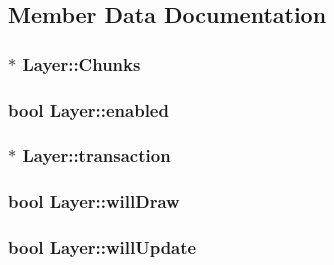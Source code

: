 \subsection{Member Data Documentation}
\hypertarget{class_layer_ab5408f6d27ad51d73df507296f16c811}{
\subsubsection[{Chunks}]{$\ast$ Layer\-::\-Chunks\hspace{0.3cm}{\ttfamily [protected]}}}\label{class_layer_ab5408f6d27ad51d73df507296f16c811}
\hypertarget{class_layer_af9f9c9a8c4a053bd829a06273df297bd}{
\subsubsection[{enabled}]{\setlength{\rightskip}{0pt plus 5cm}bool Layer\-::enabled\hspace{0.3cm}{\ttfamily [protected]}}}\label{class_layer_af9f9c9a8c4a053bd829a06273df297bd}
\hypertarget{class_layer_a3f0f6e109409d047c650380b6715c316}{
\subsubsection[{transaction}]{$\ast$ Layer\-::transaction\hspace{0.3cm}{\ttfamily [protected]}}}\label{class_layer_a3f0f6e109409d047c650380b6715c316}
\hypertarget{class_layer_a64902a81921ba2fc792d044392b14ecc}{
\subsubsection[{will\-Draw}]{\setlength{\rightskip}{0pt plus 5cm}bool Layer\-::will\-Draw\hspace{0.3cm}{\ttfamily [protected]}}}\label{class_layer_a64902a81921ba2fc792d044392b14ecc}
\hypertarget{class_layer_a8c3badeb437135a265c931f4ee728a48}{
\subsubsection[{will\-Update}]{\setlength{\rightskip}{0pt plus 5cm}bool Layer\-::will\-Update\hspace{0.3cm}{\ttfamily [protected]}}}\label{class_layer_a8c3badeb437135a265c931f4ee728a48}


